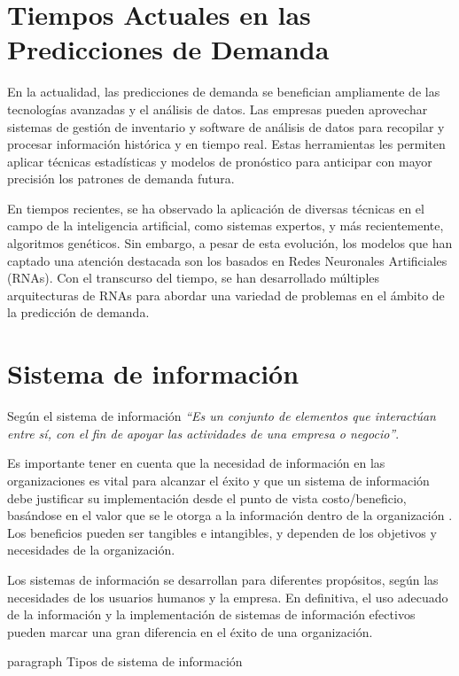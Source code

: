 \section{Tiempos Actuales en las Predicciones de Demanda}

En la actualidad, las predicciones de demanda se benefician ampliamente de las tecnologías avanzadas y el análisis de datos. Las empresas pueden aprovechar sistemas de gestión de inventario y software de análisis de datos para recopilar y procesar información histórica y en tiempo real. Estas herramientas les permiten aplicar técnicas estadísticas y modelos de pronóstico para anticipar con mayor precisión los patrones de demanda futura.

En tiempos recientes, se ha observado la aplicación de diversas técnicas en el campo de la inteligencia artificial, como sistemas expertos, y más recientemente, algoritmos genéticos. Sin embargo, a pesar de esta evolución, los modelos que han captado una atención destacada son los basados en Redes Neuronales Artificiales (RNAs). Con el transcurso del tiempo, se han desarrollado múltiples arquitecturas de RNAs para abordar una variedad de problemas en el ámbito de la predicción de demanda.

\section{Sistema de información }

Según\cite{kendall2005analisis} el sistema de información\textit{ “Es un conjunto de elementos que interactúan entre sí, con el fin de apoyar las actividades de una empresa o negocio”}.

Es importante tener en cuenta que la necesidad de información en las organizaciones es vital para alcanzar el éxito y que un sistema de información debe justificar su implementación desde el punto de vista costo/beneficio, basándose en el valor que se le otorga a la información dentro de la organización \cite{kendall2005analisis}. Los beneficios pueden ser tangibles e intangibles, y dependen de los objetivos y necesidades de la organización.

Los sistemas de información se desarrollan para diferentes propósitos, según las necesidades de los usuarios humanos y la empresa. En definitiva, el uso adecuado de la información y la implementación de sistemas de información efectivos pueden marcar una gran diferencia en el éxito de una organización.

paragraph{ Tipos de sistema de información}


